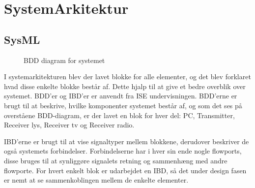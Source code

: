 \clearpage

\section{SystemArkitektur}

\subsection{SysML} 

\begin{figure}[h]
	\centering {}
	\caption{BDD diagram for systemet}
\end{figure}

I systemarkitekturen blev der lavet blokke for alle elementer, og det blev forklaret hvad disse enkelte blokke består af. Dette hjalp til at give et bedre overblik over systemet. BDD'er og IBD'er er anvendt fra ISE undervisningen. BDD'erne er brugt til at beskrive, hvilke komponenter systemet består af, og som det ses på overståene BDD-diagram, er der lavet en blok for hver del: PC, Transmitter, Receiver lys, Receiver tv og Receiver radio.

IBD'erne er brugt til at vise signaltyper mellem blokkene, derudover beskriver de også systemets forbindelser. Forbindelserne har i hver sin ende nogle flowports, disse bruges til at synliggøre signalets retning og sammenhæng med andre flowporte. For hvert enkelt blok er udarbejdet en IBD, så det under design fasen er nemt at se sammenkoblingen mellem de enkelte elementer.

